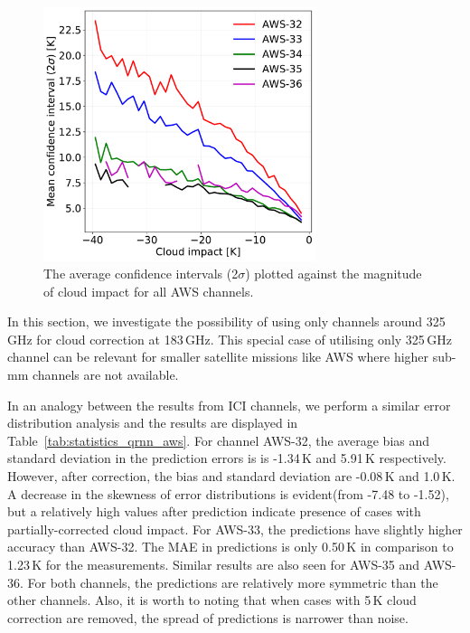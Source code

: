 \documentclass[amt, manuscript]{copernicus}
\begin{document}
\begin{figure}[t]
	\includegraphics[width = 80mm]{Figures/cloud_impact_uncertainty_AWS.pdf}	
	\caption{The average confidence intervals (2$\sigma$) plotted against the magnitude of cloud impact for all AWS channels.}
	\label{fig:uncertainty_cloud_impact}	
\end{figure}

In this section, we investigate the possibility of using only channels around 325\,GHz for cloud correction at 183\,GHz. This special case of utilising only 325\,GHz channel can be relevant for smaller satellite missions like AWS where higher sub-mm channels are not available. 

In an analogy between the results from ICI channels, we perform a similar error distribution analysis 
and the results are displayed in Table~\ref{tab:statistics_qrnn_aws}. For channel AWS-32, the average bias and standard deviation in the prediction errors is is -1.34\,K and 5.91\,K respectively. However, after correction, the bias and standard deviation are -0.08\,K and 1.0\,K. A decrease in the skewness of error distributions is evident(from -7.48 to -1.52), but a relatively high values after prediction indicate presence of cases with partially-corrected cloud impact. For AWS-33, the predictions have slightly higher accuracy than AWS-32. The MAE in predictions is only 0.50\,K in comparison to 1.23\,K for the measurements. Similar results are also seen for AWS-35 and AWS-36. For both channels, the predictions are relatively more symmetric than the other channels. Also, it is worth to noting that when cases with 5\,K cloud correction are removed, the spread of predictions is narrower than noise. 
\end{document}

